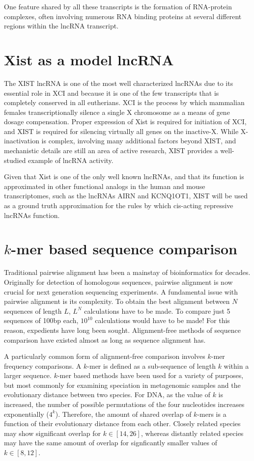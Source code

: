 One feature shared by all these transcripts is the formation of RNA-protein complexes, often involving numerous RNA binding proteins at several different regions within the lncRNA transcript. 

\section{Xist as a model lncRNA}
The XIST lncRNA is one of the most well characterized lncRNAs due to its essential role in XCI and because it is one of the few transcripts that is completely conserved in all eutherians. XCI is the process by which mammalian females transcriptionally silence a single X chromosome as a means of gene dosage compensation. Proper expression of Xist is required for initiation of XCI, and XIST is required for silencing virtually all genes on the inactive-X. While X-inactivation is complex, involving many additional factors beyond XIST, and mechanistic details are still an area of active research, XIST provides a well-studied example of lncRNA activity.

Given that Xist is one of the only well known lncRNAs, and that its function is approximated in other functional analogs in the human and mouse transcriptomes, such as the lncRNAs AIRN and KCNQ1OT1, XIST will be used as a ground truth approximation for the rules by which cis-acting repressive lncRNAs function.

\section{$k$-mer based sequence comparison}
Traditional pairwise alignment has been a mainstay of bioinformatics for decades. Originally for detection of homologous sequences, pairwise alignment is now crucial for next generation sequencing experiments. A fundamental issue with pairwise alignment is its complexity. To obtain the best alignment between $N$ sequences of length $L$, $L^N$ calculations have to be made. To compare just 5 sequences of 100bp each, $10^{10}$ calculations would have to be made! For this reason, expedients have long been sought. Alignment-free methods of sequence comparison have existed almost as long as sequence alignment has.

A particularly common form of alignment-free comparison involves $k$-mer frequency comparisons. A $k$-mer is defined as a sub-sequence of length $k$ within a larger sequence. $k$-mer based methods have been used for a variety of purposes, but most commonly for examining speciation in metagenomic samples and the evolutionary distance between two species. For DNA, as the value of $k$ is increased, the number of possible permutations of the four nucleotides increases exponentially ($4^k$). Therefore, the amount of shared overlap of $k$-mers is a function of their evolutionary distance from each other. Closely related species may show significant overlap for $k\in[14,26]$, whereas distantly related species may have the same amount of overlap for signficantly smaller values of $k\in[8,12]$.

